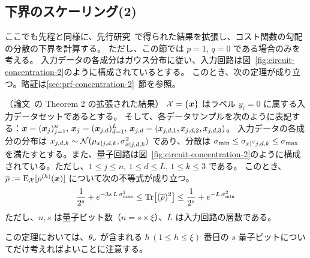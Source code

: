 \subsection{下界のスケーリング(2)}
ここでも先程と同様に、先行研究~\cite{li2022concentration}で得られた結果を拡張し、コスト関数の勾配の分散の下界を計算する。
ただし、この節では $p = 1,\, q = 0$ である場合のみを考える。
入力データの各成分はガウス分布に従い、入力回路は図~\ref{fig:circuit-concentration-2}のように構成されているとする。
このとき、次の定理が成り立つ。略証は\ref{sec:prf-concentration-2}~節を参照。
\begin{screen}
    \begin{theorem}\label{thm:concentration-2}
        （論文~\cite{li2022concentration}の Theorem 2 の拡張された結果）
        $\mathcal{X} = \{\boldsymbol{x}\}$ はラベル $y_i=0$ に属する入力データセットであるとする。
        そして、各データサンプルを次のように表記する：$\boldsymbol{x} = (\boldsymbol{x}_{j})_{j=1}^n,\, \boldsymbol{x}_{j} = (\boldsymbol{x}_{j,d})_{d=1}^L,\,\boldsymbol{x}_{j,d} = (x_{j,d,1},x_{j,d,2},x_{j,d,3})$。
        入力データの各成分の分布は $x_{j,d,k} \sim \mathcal{N}(\mu_{x|j,d,k}, \sigma_{x|j,d,k}^2)$ であり、分散は $\sigma_{\min} \leq \sigma_{x|{}^\forall j,d,k} \leq \sigma_{\max}$ を満たすとする。また、量子回路は図~\ref{fig:circuit-concentration-2}のように構成されている。ただし、$1\leq j\leq n,\, 1\leq d\leq L,\,1\leq k\leq 3$ である。
        このとき、$\overline{\rho} := \operatorname{E}_{\mathcal{X}}[\rho^{(h)}(\boldsymbol{x})]$ について次の不等式が成り立つ。
        \begin{align}
            \frac{1}{2^s} + e^{-3s\,L\,\sigma_{\max}^2}
            \leq \Tr[(\overline{\rho})^2]
            \leq \frac{1}{2^s} + e^{-L\,\sigma_{\min}^2}
        \end{align}
        ただし、$n,s$ は量子ビット数（$n=s\times\xi$）、$L$ は入力回路の層数である。
    \end{theorem}
\end{screen}
この定理においては、$\theta_\nu$ が含まれる $h\,(1\leq h\leq\xi)$ 番目の $s$ 量子ビットについてだけ考えればよいことに注意する。


